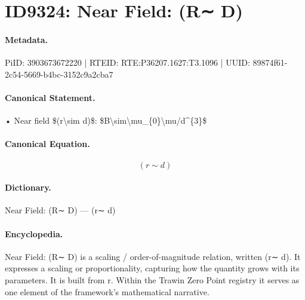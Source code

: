 \section*{ID9324: Near Field: (R∼ D)}
\paragraph{Metadata.}
PiID: 3903673672220 | RTEID: RTE:P36207.1627:T3.1096 | UUID: 89874f61-2c54-5669-b4bc-3152c9a2cba7

\paragraph{Canonical Statement.}
• Near field \$(r\textbackslash{}sim d)\$: \$B\textbackslash{}sim\textbackslash{}mu\_\{0\}\textbackslash{}mu/d\textasciicircum{}\{3\}\$

\paragraph{Canonical Equation.}
\[
(r\sim d)
\]

\paragraph{Dictionary.}
Near Field: (R∼ D) — (r∼ d)

\paragraph{Encyclopedia.}
Near Field: (R∼ D) is a scaling / order-of-magnitude relation, written (r∼ d). It expresses a scaling or proportionality, capturing how the quantity grows with its parameters. It is built from r. Within the Trawin Zero Point registry it serves as one element of the framework's mathematical narrative.
